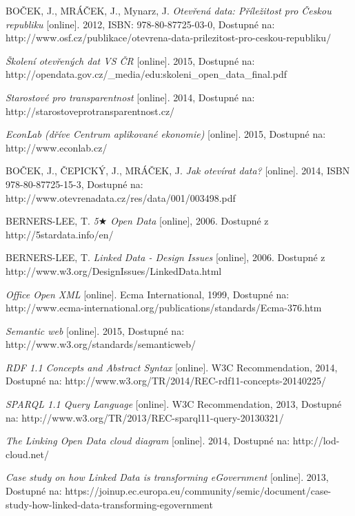 \begin{thebibliography}{99}
  BOČEK, J., MRÁČEK, J., Mynarz, J.
  \emph{Otevřená data: Příležitost pro Českou republiku} 
  [online]. 2012, ISBN: 978-80-87725-03-0, Dostupné na: 
  http://www.osf.cz/publikace/otevrena-data-prilezitost-pro-ceskou-republiku/
  
  \emph{Školení otevřených dat VS ČR} 
  [online]. 2015, Dostupné na: 
  http://opendata.gov.cz/\_media/edu:skoleni\_open\_data\_final.pdf

  \emph{Starostové pro transparentnost} 
  [online]. 2014, Dostupné na: 
  http://starostoveprotransparentnost.cz/ 

  \emph{EconLab (dříve Centrum aplikované ekonomie)} 
  [online]. 2015, Dostupné na: 
  http://www.econlab.cz/
  
  BOČEK, J., ČEPICKÝ, J., MRÁČEK, J.
  \emph{Jak otevírat data?} 
  [online]. 2014, ISBN 978-80-87725-15-3, Dostupné na: 
  http://www.otevrenadata.cz/res/data/001/003498.pdf
  
  BERNERS-LEE, T.
  \emph{5$\bigstar$ Open Data}
  [online], 2006. Dostupné z 
  http://5stardata.info/en/  
  
  BERNERS-LEE, T.
  \emph{Linked Data - Design Issues}
  [online], 2006. Dostupné z 
  http://www.w3.org/DesignIssues/LinkedData.html
  
  \emph{Office Open XML} 
  [online]. Ecma International, 1999, Dostupné na: 
  http://www.ecma-international.org/publications/standards/Ecma-376.htm
  
  \emph{Semantic web} 
  [online]. 2015, Dostupné na: 
  http://www.w3.org/standards/semanticweb/ 

  \emph{RDF 1.1 Concepts and Abstract Syntax} 
  [online]. W3C Recommendation, 2014, Dostupné na: 
  http://www.w3.org/TR/2014/REC-rdf11-concepts-20140225/  
  
  \emph{SPARQL 1.1 Query Language} 
  [online]. W3C Recommendation, 2013, Dostupné na: 
  http://www.w3.org/TR/2013/REC-sparql11-query-20130321/ 
  
  \emph{The Linking Open Data cloud diagram} 
  [online]. 2014, Dostupné na: 
  http://lod-cloud.net/
   
  \emph{Case study on how Linked Data is transforming eGovernment} 
  [online]. 2013, Dostupné na: 
  https://joinup.ec.europa.eu/community/semic/document/case-study-how-linked-data-transforming-egovernment
  

\end{thebibliography}
